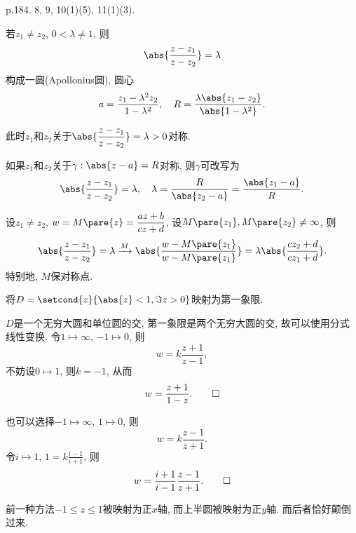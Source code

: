 \documentclass[../ComplexVariable.tex]{subfiles}
\begin{document}
p.184. 8, 9, 10(1)(5), 11(1)(3).


    \begin{theorem}
        若$z_1\neq z_2$, $0<\lambda \neq 1$, 则
        \[ \abs{\frac{z-z_1}{z-z_2}} = \lambda \]
        构成一圆(Apollonius圆), 圆心
        \[ a = \frac{z_1 - \lambda^2 z_2}{1-\lambda^2},\quad R = \frac{\lambda \abs{z_1-z_2}}{\abs{1-\lambda^2}}. \]
        \par
        此时$z_1$和$z_2$关于$\displaystyle \abs{\frac{z-z_1}{z-z_2}} = \lambda > 0$对称.
        \par
        如果$z_1$和$z_2$关于$\gamma: \abs{z-a} = R$对称, 则$\gamma$可改写为
        \[ \abs{\frac{z-z_1}{z-z_2}} = \lambda,\quad \lambda = \frac{R}{\abs{z_2-a}} = \frac{\abs{z_1-a}}{R}. \]
        \par
        设$z_1\neq z_2$, $\displaystyle w=M\pare{z} = \frac{az+b}{cz+d}$, 设$M\pare{z_1}, M\pare{z_2}\neq \infty$, 则
        \[ \abs{\frac{z-z_1}{z-z_2}} = \lambda \xrightarrow{M} \abs{\frac{w-M\pare{z_1}}{w-M\pare{z_1}}} = \lambda \abs{\frac{cz_2+d}{cz_1+d}}. \]
        特别地, $M$保对称点.
    \end{theorem}
\begin{sample}
    \begin{ex}
        将$D = \setcond{z}{\abs{z}<1, \Im z>0}$映射为第一象限.
    \end{ex}
    \begin{solution}
        $D$是一个无穷大圆和单位圆的交, 第一象限是两个无穷大圆的交, 故可以使用分式线性变换. 令$1\mapsto \infty$, $-1\mapsto 0$, 则
        \[ w = k \frac{z+1}{z-1}, \]
        不妨设$0\mapsto 1$, 则$k=-1$, 从而
        \[ w = \frac{z+1}{1-z}. \qedhere \]
    \end{solution}
    \begin{solution}
        也可以选择$-1\mapsto \infty$, $1\mapsto 0$, 则
        \[ w = k\frac{z-1}{z+1}. \]
        令$i\mapsto 1$, $\displaystyle 1 = k\frac{i-1}{i+1}$, 则
        \[ w = \frac{i+1}{i-1}\frac{z-1}{z+1}. \qedhere \]
    \end{solution}
    \begin{remark}
        前一种方法$-1\le z\le 1$被映射为正$x$轴, 而上半圆被映射为正$y$轴. 而后者恰好颠倒过来.
    \end{remark}
\end{sample}
\end{document}
